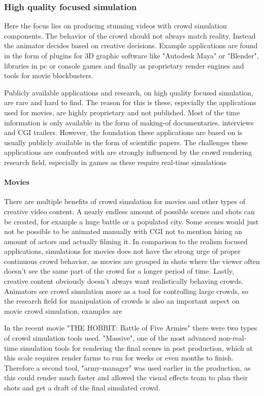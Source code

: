 \documentclass{acmsiggraph}               %
\begin{document}
\subsubsection{High quality focused simulation}
Here the focus lies on producing stunning videos with crowd simulation components. The behavior of the crowd should not always match reality. Instead the animator decides based on creative decisions. Example applications are found in the form of plugins for 3D graphic software like "Autodesk Maya" or "Blender", libraries in pc or console games and finally as proprietary render engines and tools for movie blockbusters.

Publicly available applications and research, on high quality focused simulation, are rare and hard to find. The reason for this is these, especially the applications used for movies, are highly proprietary and not published. Most of the time information is only available in the form of making-of documentaries, interviews and CGI trailers. 
However, the foundation these applications are based on is usually publicly available in the form of scientific papers. The challenges these applications are confronted with are strongly influenced by the crowd rendering research field, especially in games as these require real-time simulations %

\paragraph{Movies}

There are multiple benefits of crowd simulation for movies and other types of creative video content. A nearly endless amount of possible scenes and shots can be created, for example a huge battle or a populated city. Some scenes would just not be possible to be animated manually with CGI not to mention hiring an amount of actors and actually filming it. In comparison to the realism focused applications, simulations for movies does not have the strong urge of proper continuous crowd behavior, as movies are grouped in shots where the viewer often doesn't see the same part of the crowd for a longer period of time. Lastly, creative content obviously doesn't always want realistically behaving crowds. Animators see crowd simulation more as a tool for controlling large crowds, so the research field for manipulation of crowds is also an important aspect on movie crowd simulation,  examples are \cite{kim_interactive_2014} \cite{ulicny_crowdbrush_2004}

In the recent movie "THE HOBBIT: Battle of Five Armies" there were  two types of crowd simulation tools used. "Massive", one of the most advanced non-real-time simulation tools \cite{massive_website} for rendering the final scenes in post production, which at this scale requires render farms to run for weeks or even months to finish. Therefore a second tool, "army-manager" was used earlier in the production, as this could render much faster and allowed the visual effects team to plan their shots and get a draft of the final simulated crowd. \cite{wired_hobbit_doku}
\end{document}
